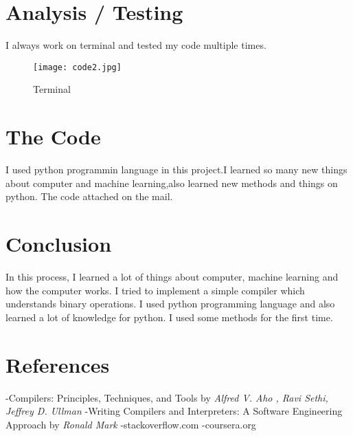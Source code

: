 \documentclass{book}
\begin{document}
 
\section{Analysis / Testing}
    I always work on terminal and tested my code multiple times.
 \begin{figure}[ht!]
\centering
\texttt{[image: code2.jpg]}
\caption{Terminal\label{overflow}}
\end{figure}
\newline
\newline
\newline
\newline
\section{The Code}
	I used python programmin language in this project.I learned so many new things about computer and machine learning,also learned new methods and things on python. The code attached on the mail.
	


\newpage
\section{Conclusion}
In this process, I learned a lot of things about computer, machine learning and how the computer works. I tried to implement a simple compiler which understands binary operations. I used python programming language and also learned a lot of knowledge for python. I used some methods for the first time. 
    


\section{References}
    -Compilers: Principles, Techniques, and Tools by \textit{Alfred V. Aho , Ravi Sethi, Jeffrey D. Ullman}\newline
    -Writing Compilers and Interpreters: A Software Engineering Approach by \textit{Ronald Mark}\newline
    -stackoverflow.com\newline
    -coursera.org\newline
    
    
\end{document}
